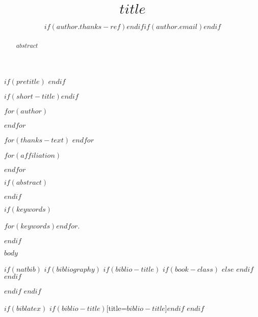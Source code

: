 \documentclass[$for(classoption)$$classoption$$sep$,$endfor$]{jdsart}
\begin{document}
\begin{frontmatter}
$if(pretitle)$
$endif$

\title{$title$}
$if(short-title)$$endif$

$for(author)$
\author[$author.marker$]{$if(author.thanks-ref)$$endif$$if(author.email)$$endif$}
$endfor$

$for(thanks-text)$
$endfor$

$for(affiliation)$
\address[$affiliation.marker$]{$if(affiliation.prefix)$$affiliation.prefix$,$endif$,}
$endfor$

$if(abstract)$
\begin{abstract}
$abstract$
\end{abstract}
$endif$

$if(keywords)$
\begin{keywords}
$for(keywords)$$endfor$.
\end{keywords}
$endif$

\end{frontmatter}

$body$

$if(natbib)$
$if(bibliography)$
$if(biblio-title)$
$if(book-class)$
\renewcommand\bibname{$biblio-title$}
$else$
\renewcommand\refname{$biblio-title$}
$endif$
$endif$


$endif$
$endif$

$if(biblatex)$
\printbibliography$if(biblio-title)$[title=$biblio-title$]$endif$
$endif$
\end{document}
